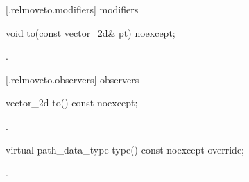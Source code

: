  [\iotwod.relmoveto.modifiers]{ modifiers}

\begin{itemdecl}
    void to(const vector_2d& pt) noexcept;
\end{itemdecl}
\begin{itemdescr}
	\pnum
	\postconditions
	.
	
\end{itemdescr}

 [\iotwod.relmoveto.observers]{ observers}

\begin{itemdecl}
    vector_2d to() const noexcept;
\end{itemdecl}
\begin{itemdescr}
	\pnum
	\returns
	.

\end{itemdescr}

\begin{itemdecl}
    virtual path_data_type type() const noexcept override;
\end{itemdecl}
\begin{itemdescr}
	\pnum
	\returns
	.

\end{itemdescr}
